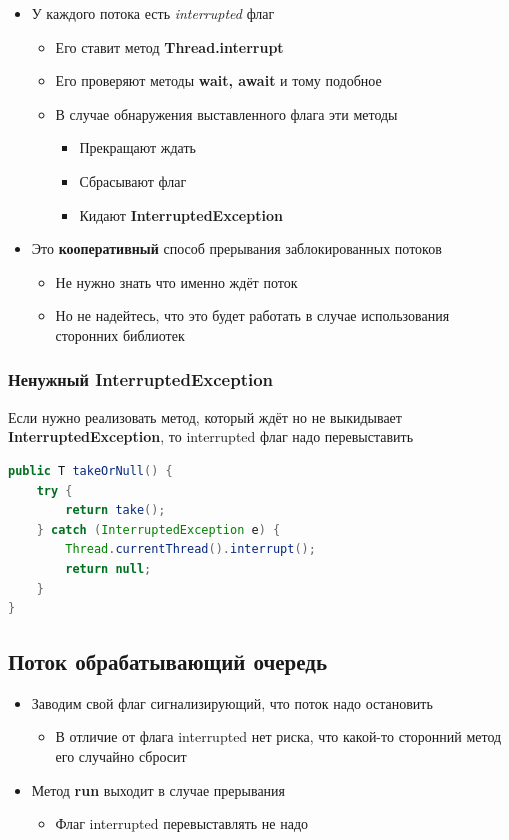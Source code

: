 \documentclass[10pt,a4paper,oneside,titlepage]{article}
\theoremstyle{plain}
\theoremstyle{defenition}
\begin{document}
\begin{itemize}
	\item У каждого потока есть \emph{interrupted} флаг
	\begin{itemize}
		\item Его ставит метод {\bfseries Thread.interrupt}
		\item Его проверяют методы {\bfseries wait, await} и тому подобное
		\item В случае обнаружения выставленного флага эти методы
		\begin{itemize}
			\item Прекращают ждать
			\item Сбрасывают флаг
			\item Кидают {\bfseries InterruptedException}
		\end{itemize}
	\end{itemize}
    \item Это {\bfseries кооперативный} способ прерывания заблокированных потоков
    \begin{itemize}
    	\item Не нужно знать что именно ждёт поток
    	\item Но не надейтесь, что это будет работать в случае использования сторонних библиотек 
    \end{itemize} 
\end{itemize}

\subsubsection{Ненужный InterruptedException}

Если нужно реализовать метод, который ждёт но не выкидывает {\bfseries InterruptedException}, то interrupted флаг надо перевыставить

\begin{lstlisting}[language=Java]
public T takeOrNull() {
    try {
        return take();
    } catch (InterruptedException e) {
        Thread.currentThread().interrupt();
        return null;
    }
}
\end{lstlisting} 

\subsection{Поток обрабатывающий очередь}

\begin{itemize}
	\item Заводим свой флаг сигнализирующий, что поток надо остановить
	\begin{itemize}
		\item В отличие от флага interrupted нет риска, что какой-то сторонний метод его случайно сбросит
	\end{itemize}
    \item Метод {\bfseries run} выходит в случае прерывания
    \begin{itemize}
    	\item Флаг interrupted перевыставлять не надо
    \end{itemize}
\end{itemize}
\end{document}
